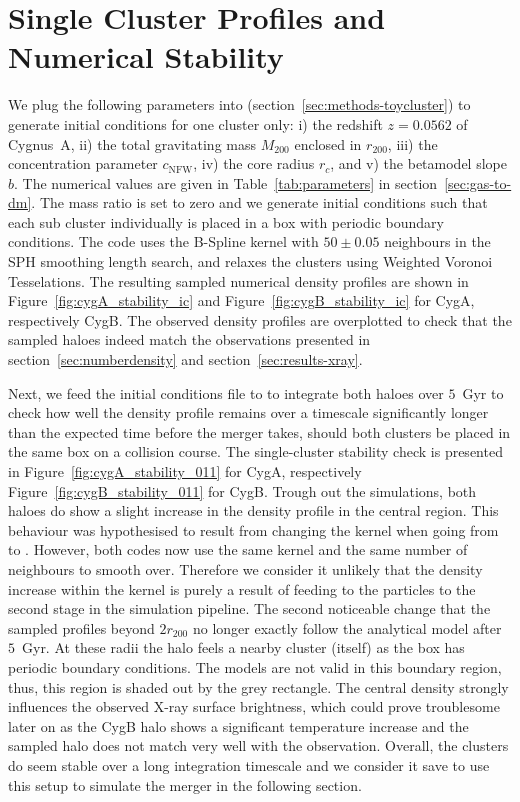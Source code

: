 \documentclass[MScProj_TLRH_ClusterEnergy.tex]{subfiles}
\begin{document}
\section{Single Cluster Profiles and Numerical Stability}
\label{sec:SingleClusters}
We plug the following parameters into  
(section~\ref{sec:methods-toycluster}) to generate initial conditions for one
cluster only:  i) the redshift $z=0.0562$ of Cygnus~A, ii) the total gravitating
mass $M_{200}$ enclosed in $r_{200}$, iii) the concentration parameter 
$c_{\text{NFW}}$, iv) the core radius $r_c$, and v) the betamodel slope $b$.
The numerical values are given in Table~\ref{tab:parameters} in 
section~\ref{sec:gas-to-dm}. The mass ratio is set to zero and we generate initial
conditions such that each sub cluster individually is placed in a box with periodic
boundary conditions. The code uses the B-Spline kernel with $50 \pm 0.05$ neighbours
in the SPH smoothing length search, and relaxes the clusters using Weighted Voronoi 
Tesselations. The resulting sampled numerical density profiles are shown in 
Figure~\ref{fig:cygA_stability_ic} and Figure~\ref{fig:cygB_stability_ic} for CygA,
respectively CygB. The observed density profiles are overplotted to check that the
sampled haloes indeed match the observations presented in 
section~\ref{sec:numberdensity} and section~\ref{sec:results-xray}. 

Next, we feed the initial conditions file to  to integrate both 
haloes over $5$~Gyr to check how well the density profile remains over a timescale 
significantly longer than the expected time before the merger takes, should both 
clusters be placed in the same box on a collision course. The single-cluster
stability check is presented in Figure~\ref{fig:cygA_stability_011} for CygA,
respectively Figure~\ref{fig:cygB_stability_011} for CygB. Trough out the simulations,
both haloes do show a slight increase in the density profile in the central region. 
This behaviour was hypothesised to result from changing the kernel when going
from  to . However, both codes now use the same
kernel and the same number of neighbours to smooth over. Therefore we consider
it unlikely that the density increase within the kernel is purely a result of
feeding to the particles to the second stage in the simulation pipeline. The
second noticeable change that the sampled profiles beyond $2 r_{200}$ no longer
exactly follow the analytical model after $5$~Gyr. At these radii the halo feels
a nearby cluster (itself) as the box has periodic boundary conditions. The models
are not valid in this boundary region, thus, this region is shaded out by the
grey rectangle. The central density strongly influences the observed X-ray
surface brightness, which could prove troublesome later on as the CygB halo
shows a significant temperature increase and the sampled halo does not match very
well with the observation. Overall, the clusters do seem stable over a long
integration timescale and we consider it save to use this setup to simulate the 
merger in the following section.
\end{document}
